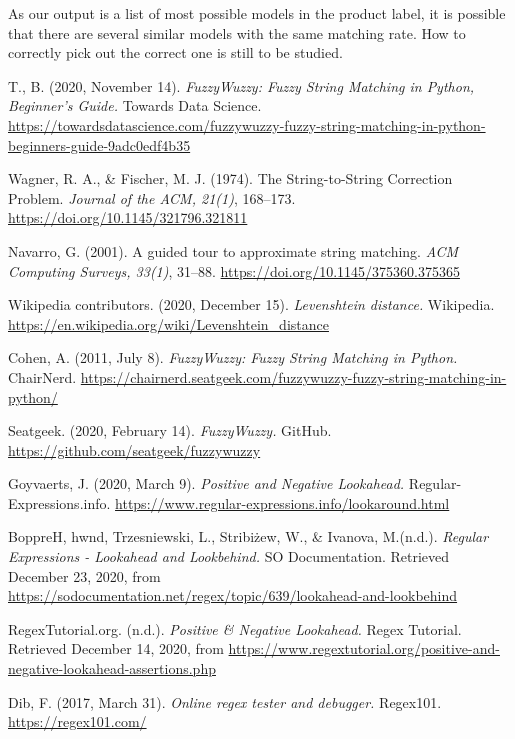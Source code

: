 \documentclass[technicalreport]{ieicej}
\begin{document}
    As our output is a list of most possible models in the product label, it is possible that there are several similar models with the same matching rate. How to correctly pick out the correct one is still to be studied.


%
%
\begin{thebibliography}{99}%
    T., B. (2020, November 14). \emph{FuzzyWuzzy: Fuzzy String Matching in Python, Beginner’s Guide.} Towards Data Science. \url{https://towardsdatascience.com/fuzzywuzzy-fuzzy-string-matching-in-python-beginners-guide-9adc0edf4b35}

    Wagner, R. A., \& Fischer, M. J. (1974). The String-to-String Correction Problem. \emph{Journal of the ACM, 21(1)}, 168–173. \url{https://doi.org/10.1145/321796.321811}

    Navarro, G. (2001). A guided tour to approximate string matching. \emph{ACM Computing Surveys, 33(1)}, 31–88. \url{https://doi.org/10.1145/375360.375365}

    Wikipedia contributors. (2020, December 15). \emph{Levenshtein distance.} Wikipedia. \url{https://en.wikipedia.org/wiki/Levenshtein_distance}

    Cohen, A. (2011, July 8). \emph{FuzzyWuzzy: Fuzzy String Matching in Python.} ChairNerd. \url{https://chairnerd.seatgeek.com/fuzzywuzzy-fuzzy-string-matching-in-python/}

    Seatgeek. (2020, February 14). \emph{FuzzyWuzzy.} GitHub. \url{https://github.com/seatgeek/fuzzywuzzy}

    Goyvaerts, J. (2020, March 9). \emph{Positive and Negative Lookahead.} Regular-Expressions.info. \url{https://www.regular-expressions.info/lookaround.html}

    BoppreH, hwnd, Trzesniewski, L., Stribiżew, W., \& Ivanova, M.(n.d.). \emph{Regular Expressions - Lookahead and Lookbehind.} SO Documentation. Retrieved December 23, 2020, from \url{https://sodocumentation.net/regex/topic/639/lookahead-and-lookbehind}

    RegexTutorial.org. (n.d.). \emph{Positive \& Negative Lookahead.} Regex Tutorial. Retrieved December 14, 2020, from \url{https://www.regextutorial.org/positive-and-negative-lookahead-assertions.php}

    Dib, F. (2017, March 31). \emph{Online regex tester and debugger.} Regex101. \url{https://regex101.com/}

\end{thebibliography}
\end{document}
